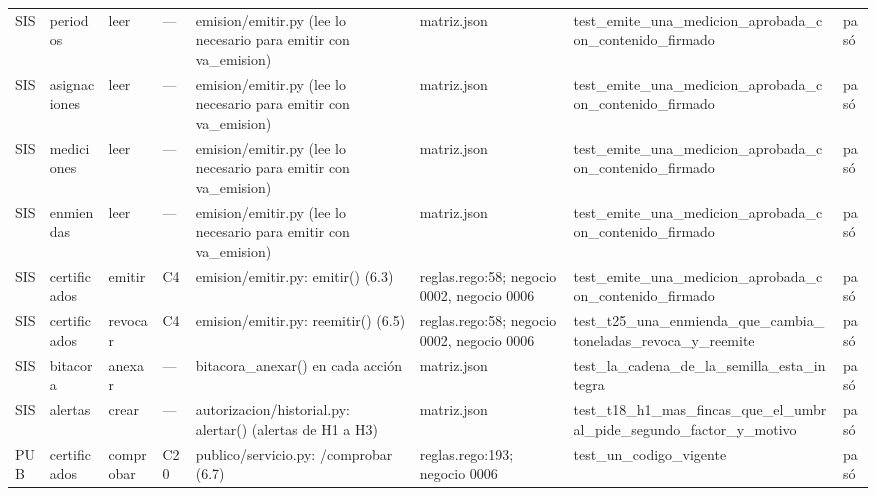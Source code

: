 \begin{center}
\begin{longtable}{@{}p{0.6cm} p{1.7cm} p{1.2cm} p{0.9cm} p{3.4cm} p{2.6cm} p{3.4cm} p{0.8cm}@{}}
SIS & periodos & leer & — & emision/emitir.py (lee lo necesario para emitir con va\_emision) & matriz.json & test\_\allowbreak{}emite\_\allowbreak{}una\_\allowbreak{}medicion\_\allowbreak{}aprobada\_\allowbreak{}con\_\allowbreak{}contenido\_\allowbreak{}firmado & pasó \\
SIS & asignaciones & leer & — & emision/emitir.py (lee lo necesario para emitir con va\_emision) & matriz.json & test\_\allowbreak{}emite\_\allowbreak{}una\_\allowbreak{}medicion\_\allowbreak{}aprobada\_\allowbreak{}con\_\allowbreak{}contenido\_\allowbreak{}firmado & pasó \\
SIS & mediciones & leer & — & emision/emitir.py (lee lo necesario para emitir con va\_emision) & matriz.json & test\_\allowbreak{}emite\_\allowbreak{}una\_\allowbreak{}medicion\_\allowbreak{}aprobada\_\allowbreak{}con\_\allowbreak{}contenido\_\allowbreak{}firmado & pasó \\
SIS & enmiendas & leer & — & emision/emitir.py (lee lo necesario para emitir con va\_emision) & matriz.json & test\_\allowbreak{}emite\_\allowbreak{}una\_\allowbreak{}medicion\_\allowbreak{}aprobada\_\allowbreak{}con\_\allowbreak{}contenido\_\allowbreak{}firmado & pasó \\
SIS & certificados & emitir & C4 & emision/emitir.py: emitir() (6.3) & reglas.rego:58; negocio 0002, negocio 0006 & test\_\allowbreak{}emite\_\allowbreak{}una\_\allowbreak{}medicion\_\allowbreak{}aprobada\_\allowbreak{}con\_\allowbreak{}contenido\_\allowbreak{}firmado & pasó \\
SIS & certificados & revocar & C4 & emision/emitir.py: reemitir() (6.5) & reglas.rego:58; negocio 0002, negocio 0006 & test\_\allowbreak{}t25\_\allowbreak{}una\_\allowbreak{}enmienda\_\allowbreak{}que\_\allowbreak{}cambia\_\allowbreak{}toneladas\_\allowbreak{}revoca\_\allowbreak{}y\_\allowbreak{}reemite & pasó \\
SIS & bitacora & anexar & — & bitacora\_anexar() en cada acción & matriz.json & test\_\allowbreak{}la\_\allowbreak{}cadena\_\allowbreak{}de\_\allowbreak{}la\_\allowbreak{}semilla\_\allowbreak{}esta\_\allowbreak{}integra & pasó \\
SIS & alertas & crear & — & autorizacion/historial.py: alertar() (alertas de H1 a H3) & matriz.json & test\_\allowbreak{}t18\_\allowbreak{}h1\_\allowbreak{}mas\_\allowbreak{}fincas\_\allowbreak{}que\_\allowbreak{}el\_\allowbreak{}umbral\_\allowbreak{}pide\_\allowbreak{}segundo\_\allowbreak{}factor\_\allowbreak{}y\_\allowbreak{}motivo & pasó \\
PUB & certificados & comprobar & C20 & publico/servicio.py: /comprobar (6.7) & reglas.rego:193; negocio 0006 & test\_\allowbreak{}un\_\allowbreak{}codigo\_\allowbreak{}vigente & pasó \\
\bottomrule
\end{longtable}
\end{center}
